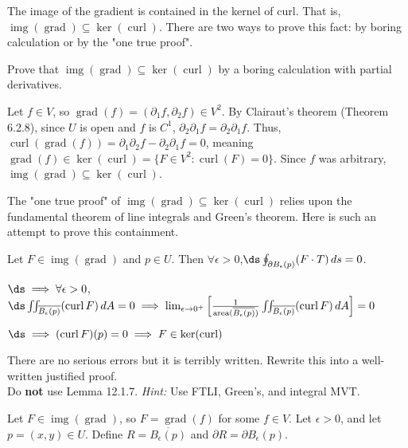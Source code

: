 \documentclass{exam}
\DeclareMathOperator{\Img}{img} %
\DeclareMathOperator{\Ker}{ker} %
\DeclareMathOperator{\Area}{area} %
\DeclareMathOperator{\Grad}{grad} %
\DeclareMathOperator{\Curl}{curl} %
\begin{document}
\begin{questions}
\begin{parts}
	\item \label{ImgKer} The image of the gradient is contained in the kernel of curl. That is, $\Img(\Grad) \subseteq \Ker (\Curl)$. There are two ways to prove this fact: by boring calculation or by the "one true proof". 
	
	Prove that $\Img(\Grad) \subseteq \Ker (\Curl)$ by a boring calculation with partial derivatives.  
	\begin{answer}{120pt}
Let $f\in V$, so $\Grad(f)=(\partial_1 f,\partial_2 f) \in V^2$. By Clairaut's theorem (Theorem 6.2.8), since $U$ is open and $f$ is $C^1$, $\partial_2\partial_1 f=\partial_2\partial_1 f$. Thus, $\Curl(\Grad(f)) = \partial_1\partial_2 f-\partial_2\partial_1 f=0$, meaning $\Grad(f)\in\Ker(\Curl)=\{F\in V^2:\Curl(F)=0\}$. Since $f$ was arbitrary, $\Img(\Grad)\subseteq\Ker(\Curl)$.
	\end{answer}	


	\pagebreak
	\item The "one true proof" of $\Img(\Grad) \subseteq \Ker (\Curl)$  relies upon the fundamental theorem of line integrals and Green's theorem.  Here is such an attempt to prove this containment. 
	\begin{lines}
		\item Let $F \in \Img(\Grad)$ and $p \in U$. Then $\forall \epsilon > 0$,$\ds\oint_{\partial B_{\epsilon}(p)} (F \cdot T)\,  ds = 0$.
		\item  $\ds \implies \forall \epsilon > 0$, $\ds \iint_{\overline{B_{\epsilon}(p)}} (\Curl F) \, dA = 0  \implies \lim_{\epsilon \to 0^+} \left[ \frac{1}{\Area(\overline{B_{\epsilon}(p)})} \iint_{\overline{B_{\epsilon}(p)}} (\Curl F) \, dA \right] = 0$
		\item $\ds  \implies  (\Curl F)(p) = 0 \implies F \in \Ker(\Curl)$ 
	\end{lines}
	There are no serious errors but it is terribly written. Rewrite this into a well-written justified proof. \\ Do \textbf{not} use Lemma 12.1.7.   \textit{Hint:} Use FTLI, Green's, and integral MVT. 

	\begin{answer}{470pt}
Let $F \in \Img(\Grad)$, so $F=\Grad(f)$ for some $f\in V$. Let $\epsilon>0$, and let $p=(x,y)\in U$. Define $R=\overline{B_{\epsilon}(p)}$ and $\partial R=\partial B_{\epsilon}(p)$.\\


\end{answer}
\end{parts}
\end{questions}
\end{document}
